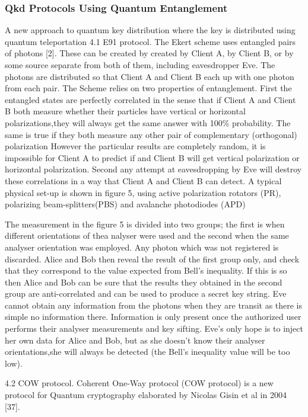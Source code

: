 \subsubsection{Qkd Protocols Using Quantum Entanglement}
A new approach to quantum key distribution where the key is distributed using quantum teleportation
4.1 E91 protocol. The Ekert scheme uses entangled pairs of photons [2]. These can be created by created by Client A, by Client B, or by some source separate from both of them, including eavesdropper Eve. The photons are distributed so that Client A and Client B each up with one photon from each pair.
The Scheme relies on two properties of entanglement. First the entangled states are perfectly correlated in the sense that if Client A and Client B both measure whether their particles have vertical or horizontal polarizations,they will always get the same answer with 100\% probability. The same is true if they both measure any other pair of complementary (orthogonal) polarization However the particular results are completely random, it is impossible for Client A to predict if and Client B will get vertical polarization or horizontal polarization.
Second any attempt at eavesdropping by Eve will destroy these correlations in a way that Client A and Client B can detect.
A typical physical set-up is shown in figure 5, using active polarization rotators (PR), polarizing beam-splitters(PBS) and avalanche photodiodes (APD)

The measurement in the figure 5 is divided into two groups; the first is when different orientations of thea nalyser were used and the second when the same analyser orientation was employed. Any photon which was not registered is discarded. Alice and Bob then reveal the result of the first group only, and check that they correspond to the value expected from Bell's inequality. If this is so then Alice and Bob can be sure that the results they obtained in the second group are anti-correlated and can be used to produce a secret key string. Eve cannot obtain any information from the photons when they are transit as there is simple no information there. Information is only present once the authorized user performs their analyser measurements and key sifting. Eve's only hope is to inject her own data for Alice and Bob, but as she doesn't know their analyser orientations,she will always be detected (the Bell's inequality value will be too low).

4.2 COW protocol. Coherent One-Way protocol (COW protocol) is a new protocol for Quantum cryptography elaborated by Nicolas Gisin et al in 2004 [37].

